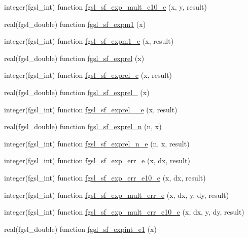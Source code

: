 \begin{DoxyCompactItemize}
\item 
integer(fgsl\+\_\+int) function \hyperlink{specfunc_8finc_a1a3354d6af9718cbbe9d95f41f2b9cd1}{fgsl\+\_\+sf\+\_\+exp\+\_\+mult\+\_\+e10\+\_\+e} (x, y, result)
\item 
real(fgsl\+\_\+double) function \hyperlink{specfunc_8finc_ad0a937e1ec4b7bdea2b628caf271786d}{fgsl\+\_\+sf\+\_\+expm1} (x)
\item 
integer(fgsl\+\_\+int) function \hyperlink{specfunc_8finc_ada0379a9eba99de7dcf4410f332c74f3}{fgsl\+\_\+sf\+\_\+expm1\+\_\+e} (x, result)
\item 
real(fgsl\+\_\+double) function \hyperlink{specfunc_8finc_ababb3e3014171c0edf9bfd8625c06998}{fgsl\+\_\+sf\+\_\+exprel} (x)
\item 
integer(fgsl\+\_\+int) function \hyperlink{specfunc_8finc_aee95356cdffdb3e951e2b3219a1329ef}{fgsl\+\_\+sf\+\_\+exprel\+\_\+e} (x, result)
\item 
real(fgsl\+\_\+double) function \hyperlink{specfunc_8finc_a1e868f3537cdc53fd75dc0e4d56942f8}{fgsl\+\_\+sf\+\_\+exprel\+\_} (x)
\item 
integer(fgsl\+\_\+int) function \hyperlink{specfunc_8finc_a584638727a909890e63dd80afd9f1de2}{fgsl\+\_\+sf\+\_\+exprel\+\_\+\_\+e} (x, result)
\item 
real(fgsl\+\_\+double) function \hyperlink{specfunc_8finc_aa1f4b697cbf2127882f14148eac03980}{fgsl\+\_\+sf\+\_\+exprel\+\_\+n} (n, x)
\item 
integer(fgsl\+\_\+int) function \hyperlink{specfunc_8finc_ae45756713b8e1fadad813ec51929beeb}{fgsl\+\_\+sf\+\_\+exprel\+\_\+n\+\_\+e} (n, x, result)
\item 
integer(fgsl\+\_\+int) function \hyperlink{specfunc_8finc_a27bd49c119d2e56693ed8f12a824d1a1}{fgsl\+\_\+sf\+\_\+exp\+\_\+err\+\_\+e} (x, dx, result)
\item 
integer(fgsl\+\_\+int) function \hyperlink{specfunc_8finc_ad8c7fec7d48cadf94025121c8c5bc735}{fgsl\+\_\+sf\+\_\+exp\+\_\+err\+\_\+e10\+\_\+e} (x, dx, result)
\item 
integer(fgsl\+\_\+int) function \hyperlink{specfunc_8finc_a6bef4e16739c2e191a1767d9c871935e}{fgsl\+\_\+sf\+\_\+exp\+\_\+mult\+\_\+err\+\_\+e} (x, dx, y, dy, result)
\item 
integer(fgsl\+\_\+int) function \hyperlink{specfunc_8finc_a6480d8ed6eb0074e26773f375d6379e0}{fgsl\+\_\+sf\+\_\+exp\+\_\+mult\+\_\+err\+\_\+e10\+\_\+e} (x, dx, y, dy, result)
\item 
real(fgsl\+\_\+double) function \hyperlink{specfunc_8finc_af3fd73541cafadd5f25039bdc364e01e}{fgsl\+\_\+sf\+\_\+expint\+\_\+e1} (x)

\end{DoxyCompactItemize}
